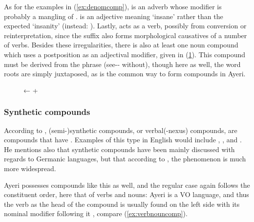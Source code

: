 As for the examples in (\ref{ex:denomcomp}),  is an
adverb whose modifier is probably a mangling of .
 is an adjective meaning `insane' rather than the
expected `insanity' (instead: ). Lastly,
 acts as a verb, possibly from conversion or
reinterpretation, since the suffix  also forms morphological
causatives of a number of verbs. Besides these irregularities, there is also at
least one noun compound which uses a postposition as an adjectival modifier,
given in (\ref{ex:nounpostposcomp}). This compound must be derived from the
phrase  (see-\Nmlz{}-\Loc{}
without), though here as well, the word roots are simply juxtaposed, as is the
common way to form compounds in Ayeri.

\begin{figure}[h]
\ex\label{ex:nounpostposcomp}
	← 
	+ 
\xe
\end{figure}


\subsubsection{Synthetic compounds}

According to \citet{bauer2001}, (semi-)synthetic compounds, or verbal(-nexus)
compounds, are compounds that have . Examples of this type in English would include
, , and . He mentions also 
that synthetic compounds have been mainly discussed with regards to Germanic
languages, but that according to \citet[3608]{lieber1994}, the phenomenon is
much more widespread.

Ayeri possesses compounds like this as well, and the regular case again follows
the constituent order, here that of verbs and nouns: Ayeri is a VO language,
and thus the verb as the head of the compound is usually found on the left side
with its nominal modifier following it \citep[compare][129--133]{gaeta2008},
compare (\ref{ex:verbnouncomp}).

